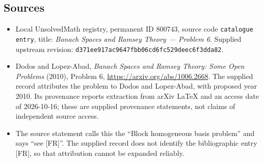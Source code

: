 \documentclass[11pt]{article}
\begin{document}
\subsection{Sources}
\begin{itemize}
\item Local UnsolvedMath registry, permanent ID \(800743\), source code \texttt{catalogue entry}, title: \emph{Banach Spaces and Ramsey Theory --- Problem 6}. Supplied upstream revision: \texttt{d371ee917ac9647fbb06cd6fc529deec6f3dda82}.
\item Dodos and Lopez-Abad, \emph{Banach Spaces and Ramsey Theory: Some Open Problems} (2010), Problem 6, \url{https://arxiv.org/abs/1006.2668}. The supplied record attributes the problem to Dodos and Lopez-Abad, with proposed year 2010. Its provenance reports extraction from arXiv LaTeX and an access date of 2026-10-16; these are supplied provenance statements, not claims of independent source access.
\item The source statement calls this the ``Block homogeneous basis problem'' and says ``see [FR]''. The supplied record does not identify the bibliographic entry [FR], so that attribution cannot be expanded reliably.
\end{itemize}
\end{document}

